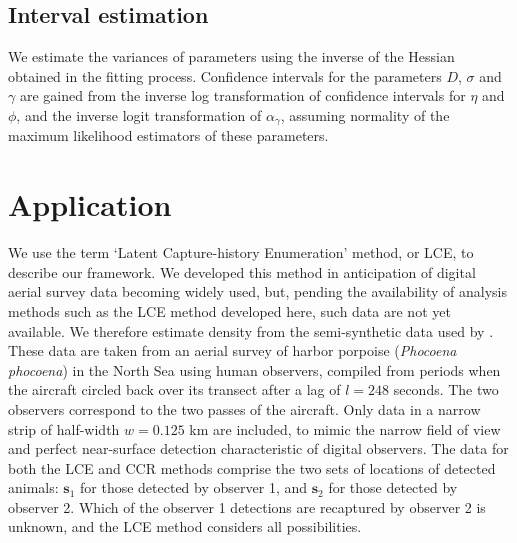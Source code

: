 \documentclass[useAMS, usenatbib, referee]{biom}\usepackage[]{graphicx}\usepackage[]{color}
\begin{document}
\subsection{Interval estimation}
\label{sec:ci}

We estimate the variances of parameters using the inverse of the Hessian obtained in the fitting process. Confidence intervals for the parameters $D$, $\sigma$ and $\gamma$ are gained from the inverse log transformation of confidence intervals for $\eta$ and $\phi$, and the inverse logit transformation of $\alpha_\gamma$, assuming normality of the maximum likelihood estimators of these parameters.


\section{Application \label{sec:applic}}

We use the term `Latent Capture-history Enumeration' method, or LCE, to describe our framework. We  developed this method in anticipation of digital aerial survey data becoming widely used, but, pending the availability of analysis methods such as the LCE method developed here, such data are not yet available. We therefore estimate density from the semi-synthetic data used by \cite{Stevenson+al:19}. These data are taken from an aerial survey of harbor porpoise ({\em Phocoena phocoena}) in the North Sea using human observers, compiled from periods when the aircraft circled back over its transect after a lag of $l=248$ seconds.
The two observers correspond to the two passes of the aircraft. Only data in a narrow strip of half-width $w=0.125$ km are included, to mimic the narrow field of view and perfect near-surface detection characteristic of digital observers. The data for both the LCE and CCR methods comprise the two sets of locations of detected animals: $\bm{s}_1$ for those detected by observer 1, and $\bm{s}_2$ for those detected by observer 2. Which of the observer 1 detections are recaptured by observer 2 is unknown, and the LCE method considers all possibilities.
\end{document}
